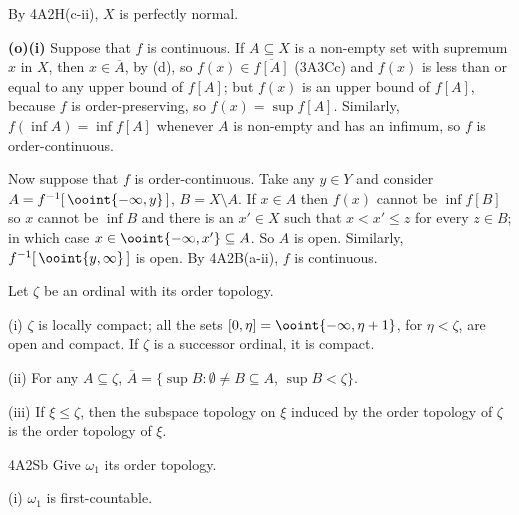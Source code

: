 {\medskip

 By 4A2H(c-ii), $X$ is perfectly normal.

\medskip

{\bf (o)(i)} Suppose that $f$ is continuous.   If $A\subseteq X$
is a non-empty set with supremum $x$ in $X$, then $x\in\overline{A}$, by
(d), so $f(x)\in\overline{f[A]}$ (3A3Cc) and $f(x)$ is less than or
equal to any upper bound of $f[A]$;  but $f(x)$ is an upper bound of
$f[A]$, because $f$ is order-preserving, so $f(x)=\sup f[A]$.
Similarly, $f(\inf A)=\inf f[A]$ whenever $A$ is non-empty and has an
infimum, so $f$ is order-continuous.

\medskip

 Now suppose that $f$ is order-continuous.   Take any
$y\in Y$ and consider $A=f^{-1}[\,\ooint{-\infty,y}\,]$,
$B=X\setminus A$.   If
$x\in A$ then $f(x)$ cannot be $\inf f[B]$ so $x$ cannot be $\inf B$ and
there is an $x'\in X$ such that $x<x'\le z$ for every $z\in B$;  in
which case
$x\in\ooint{-\infty,x'}\subseteq A$.   So $A$ is open.   Similarly,
$f^{-1}[\,\ooint{y,\infty}\,]$ is open.   By 4A2B(a-ii), $f$ is
continuous.
}%

Let $\zeta$ be an ordinal with its order topology.

\quad(i) $\zeta$ is locally compact;  all the sets
$[0,\eta]=\ooint{-\infty,\eta+1}$, for $\eta<\zeta$, are open and
compact.
If $\zeta$ is a successor ordinal, it is compact.

\quad(ii) For any $A\subseteq\zeta$,
$\overline{A}=\{\sup B:\emptyset\ne B\subseteq A,\,\sup B<\zeta\}$.

\quad (iii) If $\xi\le\zeta$, then the subspace topology on
$\xi$ induced by the order topology of $\zeta$ is the order topology of
$\xi$.  

\spheader 4A2Sb Give $\omega_1$ its order topology.

\quad(i) $\omega_1$ is first-countable.   

